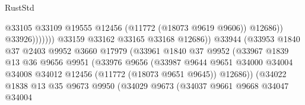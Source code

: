 \begin{lexlean}{RustStd}
\begin{coremodule}
                                                      @33105
                                                      @33109
                                                      @19555
                                                      @12456
                                                      (@11772 (@18073 @9619 @9606))
                                                      @12686))
                                                  @33926)))))))
                                    @33159
                                    @33162
                                    @33165
                                    @33168
                                    @12686))
                                @33944
                                (@33953
                                  @1840
                                  @37
                                  @2403
                                  @9952
                                  @3660
                                  @17979
                                  (@33961
                                    @1840
                                    @37
                                    @9952
                                    (@33967
                                      @1839
                                      @13
                                      @36
                                      @9656
                                      @9951
                                      (@33976
                                        @9656
                                        (@33987
                                          @9644
                                          @9651
                                          @34000
                                          @34004
                                          @34008
                                          @34012
                                          @12456
                                          (@11772 (@18073 @9651 @9645))
                                          @12686))
                                      (@34022
                                        @1838
                                        @13
                                        @35
                                        @9673
                                        @9950
                                        (@34029
                                          @9673
                                          (@34037
                                            @9661
                                            @9668
                                            @34047
                                            @34004

\end{coremodule}
\end{lexlean}
